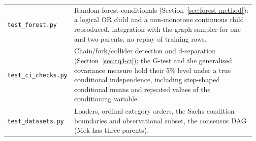 \documentclass[
  english,
  class=report,
  accentcolor=2c,
  marginpar=false,
  parskip=half-,
  fontsize=11pt,
  ruledheaders=false,
  pdfa=false,
  IMRAD=false,
  thesis={type=master}
]{tudapub}
\begin{document}
\begin{table}[ht]
\begin{tabular}{lp{8.7cm}}
\texttt{test\_forest.py} & Random-forest conditionals (Section~\ref{sec:forest-method}): a logical OR child and a non-monotone continuous child reproduced, integration with the graph sampler for one and two parents, no replay of training rows. \\
\texttt{test\_ci\_checks.py} & Chain/fork/collider detection and d-separation (Section~\ref{sec:rq4-ci}); the G-test and the generalised covariance measure hold their 5\% level under a true conditional independence, including step-shaped conditional means and repeated values of the conditioning variable. \\
\texttt{test\_datasets.py} & Loaders, ordinal category orders, the Sachs condition boundaries and observational subset, the consensus DAG (Mek has three parents). \\
\bottomrule
\end{tabular}
\end{table}

\printbibliography
\end{document}
